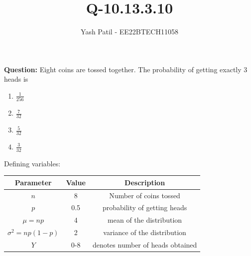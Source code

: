 \documentclass[journal,12pt,twocolumn]{IEEEtran}
\theoremstyle{remark}
\begin{document}



\vspace{3cm}

\title{
Q-10.13.3.10
}
\author{Yash Patil - EE22BTECH11058}

\maketitle
\textbf{Question:} Eight coins are tossed together. The probability of getting exactly 3 heads is
\begin{enumerate}
	\item $\frac{1}{256}$
	\item $\frac{7}{32}$
	\item $\frac{5}{32}$
	\item $\frac{3}{32}$
\end{enumerate}
\solution
Defining variables:
\begin{table}[H]
\def\arraystretch{1.2}
\begin{tabular}{|c|c|c|}
\hline
	\textbf{Parameter} &\textbf{Value} &\textbf{Description}\\ \hline
	$n$ &8 &Number of coins tossed\\ 
	\hline
	$p$ &0.5 & probability of getting heads\\ 
	\hline
	$\mu = np$ &4 & mean of the distribution\\ 
	\hline
	$\sigma^2 = np(1-p)$ &2 & variance of the distribution\\ 
	\hline
	$Y$ & 0-8 & denotes number of heads obtained\\
	\hline
\end{tabular}
\end{table}
\end{document}
